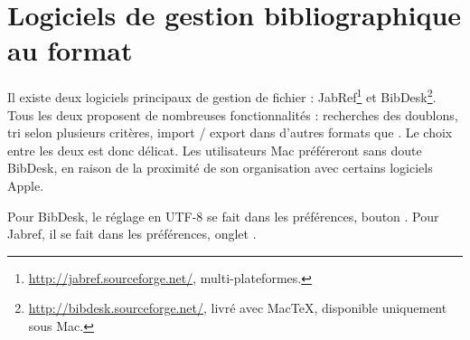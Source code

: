 \section{Logiciels de gestion bibliographique au format }\label{logicielbiblio}

Il existe deux logiciels principaux de gestion de fichier  : JabRef\footnote{\url{http://jabref.sourceforge.net/}, multi-plateformes.} et BibDesk\footnote{\url{http://bibdesk.sourceforge.net/}, livré avec MacTeX, disponible uniquement sous Mac.}. Tous les deux proposent de nombreuses fonctionnalités : recherches des doublons,  tri selon plusieurs critères, import / export dans d'autres formats que . Le choix entre les deux est donc délicat.  Les utilisateurs Mac préféreront sans doute BibDesk, en raison de la proximité de son organisation avec certains logiciels Apple. 

Pour BibDesk, le réglage en UTF-8 se fait dans les préférences, bouton . Pour  Jabref, il se fait dans les préférences, onglet .


